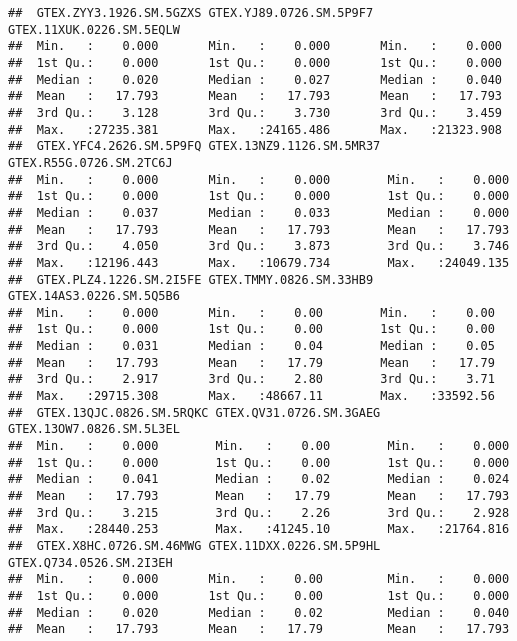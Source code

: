 \documentclass[
]{article}
\begin{document}
\begin{verbatim}
##  GTEX.ZYY3.1926.SM.5GZXS GTEX.YJ89.0726.SM.5P9F7 GTEX.11XUK.0226.SM.5EQLW
##  Min.   :    0.000       Min.   :    0.000       Min.   :    0.000       
##  1st Qu.:    0.000       1st Qu.:    0.000       1st Qu.:    0.000       
##  Median :    0.020       Median :    0.027       Median :    0.040       
##  Mean   :   17.793       Mean   :   17.793       Mean   :   17.793       
##  3rd Qu.:    3.128       3rd Qu.:    3.730       3rd Qu.:    3.459       
##  Max.   :27235.381       Max.   :24165.486       Max.   :21323.908       
##  GTEX.YFC4.2626.SM.5P9FQ GTEX.13NZ9.1126.SM.5MR37 GTEX.R55G.0726.SM.2TC6J
##  Min.   :    0.000       Min.   :    0.000        Min.   :    0.000      
##  1st Qu.:    0.000       1st Qu.:    0.000        1st Qu.:    0.000      
##  Median :    0.037       Median :    0.033        Median :    0.000      
##  Mean   :   17.793       Mean   :   17.793        Mean   :   17.793      
##  3rd Qu.:    4.050       3rd Qu.:    3.873        3rd Qu.:    3.746      
##  Max.   :12196.443       Max.   :10679.734        Max.   :24049.135      
##  GTEX.PLZ4.1226.SM.2I5FE GTEX.TMMY.0826.SM.33HB9 GTEX.14AS3.0226.SM.5Q5B6
##  Min.   :    0.000       Min.   :    0.00        Min.   :    0.00        
##  1st Qu.:    0.000       1st Qu.:    0.00        1st Qu.:    0.00        
##  Median :    0.031       Median :    0.04        Median :    0.05        
##  Mean   :   17.793       Mean   :   17.79        Mean   :   17.79        
##  3rd Qu.:    2.917       3rd Qu.:    2.80        3rd Qu.:    3.71        
##  Max.   :29715.308       Max.   :48667.11        Max.   :33592.56        
##  GTEX.13QJC.0826.SM.5RQKC GTEX.QV31.0726.SM.3GAEG GTEX.13OW7.0826.SM.5L3EL
##  Min.   :    0.000        Min.   :    0.00        Min.   :    0.000       
##  1st Qu.:    0.000        1st Qu.:    0.00        1st Qu.:    0.000       
##  Median :    0.041        Median :    0.02        Median :    0.024       
##  Mean   :   17.793        Mean   :   17.79        Mean   :   17.793       
##  3rd Qu.:    3.215        3rd Qu.:    2.26        3rd Qu.:    2.928       
##  Max.   :28440.253        Max.   :41245.10        Max.   :21764.816       
##  GTEX.X8HC.0726.SM.46MWG GTEX.11DXX.0226.SM.5P9HL GTEX.Q734.0526.SM.2I3EH
##  Min.   :    0.000       Min.   :    0.00         Min.   :    0.000      
##  1st Qu.:    0.000       1st Qu.:    0.00         1st Qu.:    0.000      
##  Median :    0.020       Median :    0.02         Median :    0.040      
##  Mean   :   17.793       Mean   :   17.79         Mean   :   17.793      

\end{verbatim}
\end{document}
